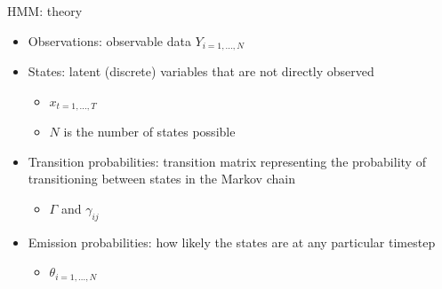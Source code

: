 \documentclass[
  ignorenonframetext,
]{beamer}
\providecommand{\tightlist}{%
  \setlength{\itemsep}{0pt}\setlength{\parskip}{0pt}}
\begin{document}
\begin{frame}{HMM: theory}
\protect\hypertarget{hmm-theory-5}{}

\begin{itemize}
\item
  Observations: observable data \({Y}_{ i=1,...,N }\)
\item
  States: latent (discrete) variables that are not directly observed

  \begin{itemize}
  \tightlist
  \item
    \({x}_{ t=1,...,T }\)
  \item
    \(N\) is the number of states possible
  \end{itemize}
\item
  Transition probabilities: transition matrix representing the
  probability of transitioning between states in the Markov chain

  \begin{itemize}
  \tightlist
  \item
    \(\Gamma\) and \({ \gamma }_{ ij }\)
  \end{itemize}
\item
  Emission probabilities: how likely the states are at any particular
  timestep

  \begin{itemize}
  \tightlist
  \item
    \({ \theta }_{ i=1,...,N }\)
  \end{itemize}
\end{itemize}

\end{frame}
\end{document}
